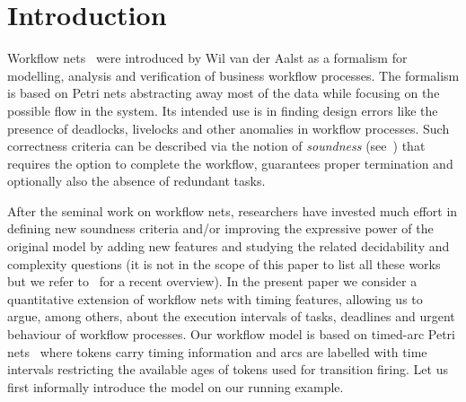 \section{Introduction}
Workflow nets~\cite{Aalst97,Aalst98} were introduced 
by Wil van der Aalst as a formalism
for modelling, analysis and verification of business workflow processes.
The formalism is based on Petri nets abstracting away most of the data 
while focusing on the possible flow in the system. 
Its intended use is in finding design errors 
like the presence of deadlocks, livelocks 
and other anomalies in workflow processes. Such correctness criteria can
be described via the notion of \emph{soundness} (see~\cite{AalstHHSVVW11}) that
requires the option to complete the workflow, guarantees proper termination
and optionally also the absence of redundant tasks. 

After the seminal work on workflow nets, researchers have 
invested much effort in defining new soundness criteria and/or 
improving the expressive power of the original model by adding new features 
and studying the related decidability and 
complexity questions
(it is not in the scope of this paper to list all these works but we
refer to~\cite{AalstHHSVVW11} for a recent overview).
In the present paper we consider a quantitative extension of workflow 
nets with timing features, allowing us to argue, among others, 
about the execution intervals of tasks, deadlines and urgent behaviour of workflow processes. Our workflow
model is based on timed-arc Petri nets~\cite{BLT:90,Hanisch:93} 
where tokens carry timing information
and arcs are labelled with time intervals restricting the available
ages of tokens used for transition firing. %
Let us first informally introduce 
the model on our running example.

